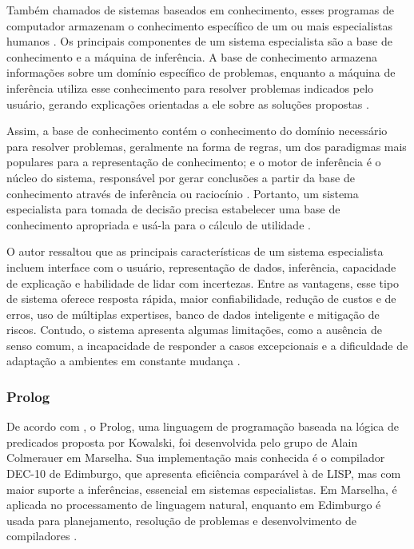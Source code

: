 Também chamados de sistemas baseados em conhecimento, esses programas de computador armazenam o conhecimento específico de um ou mais especialistas humanos \cite{jimmysingla}. Os principais componentes de um sistema especialista são a base de conhecimento e a máquina de inferência. A base de conhecimento armazena informações sobre um domínio específico de problemas, enquanto a máquina de inferência utiliza esse conhecimento para resolver problemas indicados pelo usuário, gerando explicações orientadas a ele sobre as soluções propostas \cite{markobohanec}. 

Assim, a base de conhecimento contém o conhecimento do domínio necessário para resolver problemas, geralmente na forma de regras, um dos paradigmas mais populares para a representação de conhecimento; e o motor de inferência é o núcleo do sistema, responsável por gerar conclusões a partir da base de conhecimento através de inferência ou raciocínio \cite{jimmysingla}. Portanto, um sistema especialista para tomada de decisão precisa estabelecer uma base de conhecimento apropriada e usá-la para o cálculo de utilidade \cite{markobohanec}.

O autor \textcite{jimmysingla} ressaltou que as principais características de um sistema especialista incluem interface com o usuário, representação de dados, inferência, capacidade de explicação e habilidade de lidar com incertezas. Entre as vantagens, esse tipo de sistema oferece resposta rápida, maior confiabilidade, redução de custos e de erros, uso de múltiplas expertises, banco de dados inteligente e mitigação de riscos. Contudo, o sistema apresenta algumas limitações, como a ausência de senso comum, a incapacidade de responder a casos excepcionais e a dificuldade de adaptação a ambientes em constante mudança \cite{jimmysingla}. 

\subsubsection{Prolog}

De acordo com \textcite{keithclark}, o Prolog, uma linguagem de programação baseada na lógica de predicados proposta por Kowalski, foi desenvolvida pelo grupo de Alain Colmerauer em Marselha. Sua implementação mais conhecida é o compilador DEC-10 de Edimburgo, que apresenta eficiência comparável à de LISP, mas com maior suporte a inferências, essencial em sistemas especialistas. Em Marselha, é aplicada no processamento de linguagem natural, enquanto em Edimburgo é usada para planejamento, resolução de problemas e desenvolvimento de compiladores \cite{keithclark}.

